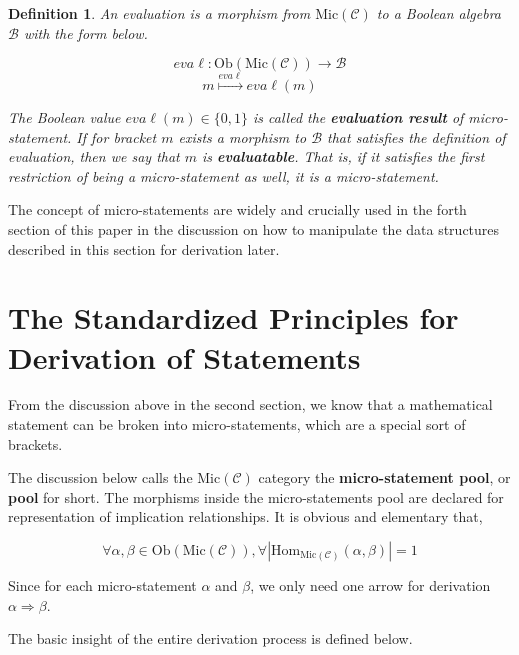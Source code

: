 \documentclass{article}
\newtheorem{definition}{Definition}	%
\numberwithin{theorem}{section}	%
\numberwithin{axiom}{section}	%
\numberwithin{definition}{section}	%
\begin{document}
\begin{definition}
	An evaluation is a morphism from \(\text{Mic}(\mathcal{C})\) to a Boolean algebra \(\mathcal{B}\) with the form below.
	
	\[\mathit{e}\mathit{v}\mathit{a}\ell :\text{Ob}(\text{Mic}(\mathcal{C}))\to \mathcal{B}\]
	\[\mathit{m}\overset{\mathit{e}\mathit{v}\mathit{a}\ell }{\mapsto }\mathit{e}\mathit{v}\mathit{a}\ell (\mathit{m})\]
	
	The Boolean value \(\mathit{e}\mathit{v}\mathit{a}\ell (\mathit{m})\in \{0,1\}\) is called the \textbf{ evaluation result} of micro-statement. If for bracket \(\mathit{m}\) exists a morphism to \(\mathcal{B}\) that satisfies the definition of evaluation, then we say that \(\mathit{m}\) is \textbf{ evaluatable}. That is, if it satisfies the first restriction of being a micro-statement as well, it is a micro-statement.
\end{definition}

The concept of micro-statements are widely and crucially used in the forth section of this paper in the discussion on how to manipulate the data structures described in this section for derivation later.

\section{The Standardized Principles for Derivation of Statements}

From the discussion above in the second section, we know that a mathematical statement can be broken into micro-statements, which are a special sort of brackets.

The discussion below calls the \(\text{Mic}(\mathcal{C})\) category the \textbf{ micro-statement pool}, or \textbf{ pool} for short. The morphisms inside the micro-statements pool are declared for representation of implication relationships. It is obvious and elementary that,

\[\forall \alpha ,\beta \in \text{Ob}(\text{Mic}(\mathcal{C})), \forall \left|\text{Hom}_{\text{Mic}(\mathcal{C})}(\alpha ,\beta )\right|=1\]

Since for each micro-statement \(\alpha\) and \(\beta\), we only need one arrow for derivation \(\alpha \Rightarrow \beta\).

The basic insight of the entire derivation process is defined below.
\end{document}

